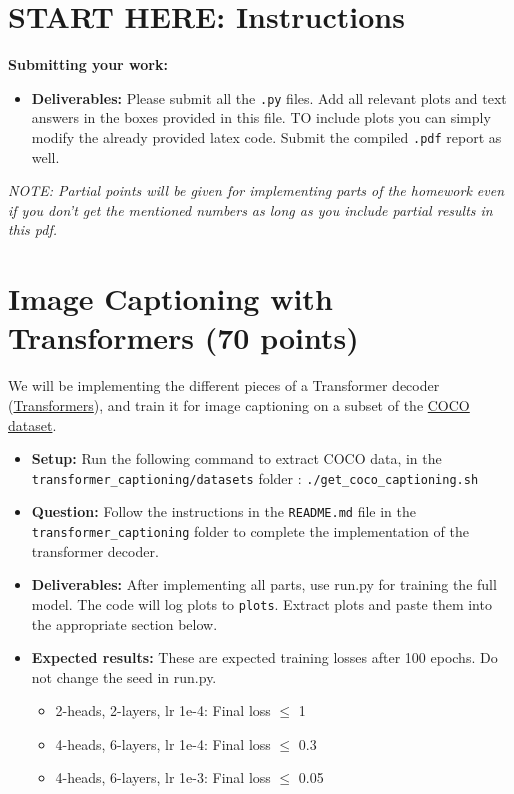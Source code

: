 \documentclass[11pt,addpoints,answers]{exam}
\begin{document}
\section*{}


\section*{START HERE: Instructions}

\textbf{Submitting your work:}

\begin{itemize}
\item \textbf{Deliverables:} Please submit all the \texttt{.py} files. Add all relevant plots and text answers in the boxes provided in this file. TO include plots you can simply modify the already provided latex code. Submit the compiled \texttt{.pdf} report as well.
\end{itemize}
\emph{NOTE: Partial points will be given for implementing parts of the homework even if you don't get the mentioned numbers as long as you include partial results in this pdf.}
\clearpage

\section{Image Captioning with Transformers (70 points)}



We will be implementing the different pieces of a Transformer decoder (\href{https://arxiv.org/pdf/1706.03762.pdf}{Transformers}), and train it for image captioning on a subset of the \href{https://cocodataset.org/#home}{COCO dataset}. 
\begin{itemize}
    \item \textbf{Setup:} Run the following command to extract COCO data, in the \texttt{transformer\_captioning/datasets} folder : \texttt{./get\_coco\_captioning.sh}
\item \textbf{Question:} Follow the instructions in the \texttt{README.md} file in the \texttt{transformer\_captioning} folder to complete the implementation of the transformer decoder.
\item \textbf{Deliverables:} After implementing all parts, use run.py for training the full model. The code will log plots to \texttt{plots}. Extract plots and paste them into the appropriate section below. 

\item \textbf{Expected results:}
    These are expected training losses after 100 epochs. Do not change the seed in run.py.
    \begin{itemize}
        \item 2-heads, 2-layers, lr 1e-4: Final loss $\leq$ 1 
        \item 4-heads, 6-layers, lr 1e-4: Final loss $\leq$ 0.3 
        \item 4-heads, 6-layers, lr 1e-3: Final loss $\leq$ 0.05
    \end{itemize}
\end{itemize}
\end{document}
